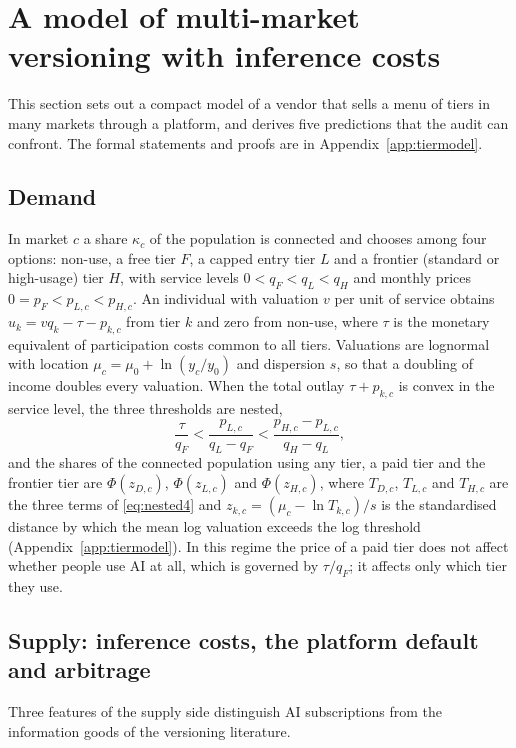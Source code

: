 \documentclass[11pt]{article}
\theoremstyle{definition}
\theoremstyle{remark}
\begin{document}
\section{A model of multi-market versioning with inference costs}\label{sec:model}

This section sets out a compact model of a vendor that sells a menu of tiers in many markets through a platform, and derives five predictions that the audit can confront. The formal statements and proofs are in Appendix~\ref{app:tiermodel}.

\subsection{Demand}

In market $c$ a share $\kappa_c$ of the population is connected and chooses among four options: non-use, a free tier $F$, a capped entry tier $L$ and a frontier (standard or high-usage) tier $H$, with service levels $0<q_F<q_L<q_H$ and monthly prices $0=p_{F}<p_{L,c}<p_{H,c}$. An individual with valuation $v$ per unit of service obtains $u_k=vq_k-\tau-p_{k,c}$ from tier $k$ and zero from non-use, where $\tau$ is the monetary equivalent of participation costs common to all tiers. Valuations are lognormal with location $\mu_c=\mu_0+\ln(y_c/y_0)$ and dispersion $s$, so that a doubling of income doubles every valuation. When the total outlay $\tau+p_{k,c}$ is convex in the service level, the three thresholds are nested,
\begin{equation}
\frac{\tau}{q_F}<\frac{p_{L,c}}{q_L-q_F}<\frac{p_{H,c}-p_{L,c}}{q_H-q_L},
\label{eq:nested4}
\end{equation}
and the shares of the connected population using any tier, a paid tier and the frontier tier are $\Phi(z_{D,c})$, $\Phi(z_{L,c})$ and $\Phi(z_{H,c})$, where $T_{D,c}$, $T_{L,c}$ and $T_{H,c}$ are the three terms of \eqref{eq:nested4} and $z_{k,c}=(\mu_c-\ln T_{k,c})/s$ is the standardised distance by which the mean log valuation exceeds the log threshold (Appendix~\ref{app:tiermodel}). In this regime the price of a paid tier does not affect whether people use AI at all, which is governed by $\tau/q_F$; it affects only which tier they use.

\subsection{Supply: inference costs, the platform default and arbitrage}

Three features of the supply side distinguish AI subscriptions from the information goods of the versioning literature.
\end{document}
